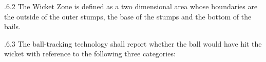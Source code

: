\documentclass[12pt]{article}
\begin{document}
\vspace{\baselineskip}
\begin{adjustwidth}{1.18in}{0.15in}
{\fontsize{9pt}{10.8pt}.6.2 \tabto{1.17in} The Wicket Zone is defined as a two dimensional area whose boundaries are the outside of the outer stumps, the base of the stumps and the bottom of the bails.\par}\par

\end{adjustwidth}


\vspace{\baselineskip}

\vspace{\baselineskip}

\vspace{\baselineskip}
\begin{adjustwidth}{0.0in}{0.08in}
\begin{Center}
{\fontsize{8pt}{9.6pt}\par}
\end{Center}\par

\end{adjustwidth}


\vspace{\baselineskip}

\vspace{\baselineskip}
\begin{adjustwidth}{1.18in}{0.58in}
{\fontsize{9pt}{10.8pt}.6.3 \tabto{1.17in} The ball-tracking technology shall report whether the ball would have hit the wicket with reference to the following three categories:\par}\par

\end{adjustwidth}


\vspace{\baselineskip}


\end{document}
